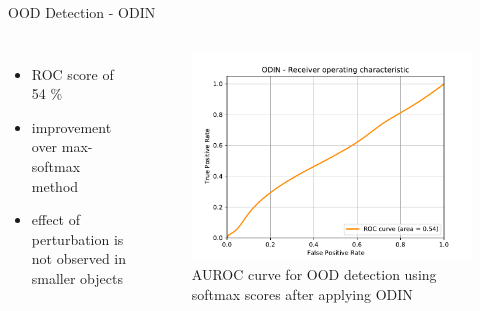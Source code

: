 \documentclass[10pt, aspectratio=169]{beamer}
\begin{document}
\begin{frame}[allowframebreaks]{OOD Detection - ODIN}
        \begin{columns}
                \begin{itemize}
                    \item ROC score of 54 \%
                    \item improvement over max-softmax method 
                    \item effect of perturbation is not observed in smaller objects
                \end{itemize}
                \begin{figure}[!ht]
                    \centering
                    \includegraphics[scale=0.45]{images/BDD100K vs IDD_ODIN_ROC.pdf}
                    \caption[SSD framework]{AUROC curve for OOD detection using softmax scores after applying ODIN}
                \end{figure}
        \end{columns}
\end{frame}
\end{document}
